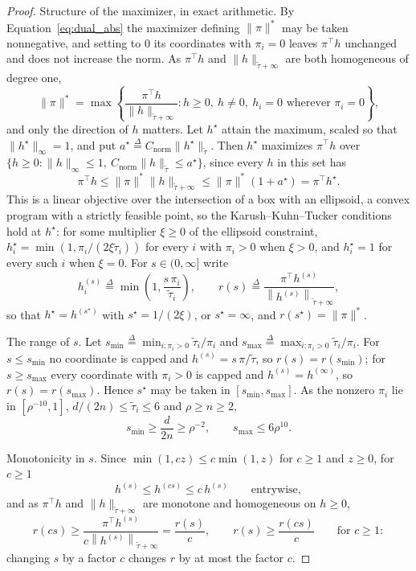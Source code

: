 \documentclass[11pt]{article}
\newcommand{\tautil}{\widetilde{\tau}}
\newcommand{\defeq}{\stackrel{\Delta}{=}}
\newcommand{\Cnorm}{C_{\mathrm{norm}}}
\begin{document}
\begin{proof}
Structure of the maximizer, in exact arithmetic.
By Equation~\eqref{eq:dual_abs} the maximizer defining $\|\pi\|^{*}$ may be
taken nonnegative, and setting to $0$ its coordinates with
$\pi_i = 0$ leaves
$\pi^\top h$ unchanged and does not increase the norm.
As $\pi^\top h$ and
$\|h\|_{\tautil + \infty}$ are both homogeneous of degree one,
\begin{equation}
\label{eq:dual_ratio}
\|\pi\|^{*}
=
\max\left\{
\frac{\pi^\top h}{\|h\|_{\tautil + \infty}}
:
h \ge 0, \ h \ne 0, \ h_i = 0 \text{ wherever } \pi_i = 0
\right\} ,
\end{equation}
and only the direction of $h$ matters.
Let $h^{\star}$ attain the maximum, scaled so that
$\|h^{\star}\|_{\infty} = 1$, and put
$a^{\star} \defeq \Cnorm \|h^{\star}\|_{\tautil}$.
Then $h^{\star}$ maximizes
$\pi^\top h$ over
$\{ h \ge 0 : \|h\|_{\infty} \le 1, \ \Cnorm \|h\|_{\tautil} \le a^{\star} \}$,
since every $h$ in this set has
\[
\pi^\top h
\le
\|\pi\|^{*} \|h\|_{\tautil + \infty}
\le
\|\pi\|^{*} \left( 1 + a^{\star} \right)
=
\pi^\top h^{\star} .
\]
This is a linear objective over the intersection of a box with an ellipsoid, a
convex program with a strictly feasible point, so the Karush--Kuhn--Tucker
conditions hold at $h^{\star}$: for some multiplier
$\xi \ge 0$ of the ellipsoid constraint,
$h^{\star}_i = \min(1, \pi_i / (2 \xi \tautil_i))$ for every
$i$ with
$\pi_i > 0$ when
$\xi > 0$, and
$h^{\star}_i = 1$ for every such
$i$ when
$\xi = 0$.
For $s \in (0, \infty]$ write
\[
h^{(s)}_i
\defeq
\min\left( 1, \frac{s \, \pi_i}{\tautil_i} \right),
\qquad
r(s)
\defeq
\frac{\pi^\top h^{(s)}}{\left\| h^{(s)} \right\|_{\tautil + \infty}} ,
\]
so that $h^{\star} = h^{(s^{\star})}$ with
$s^{\star} = 1 / (2 \xi)$, or
$s^{\star} = \infty$, and
$r(s^{\star}) = \|\pi\|^{*}$.

The range of $s$.
Let $s_{\min} \defeq \min_{i : \pi_i > 0} \tautil_i / \pi_i$ and
$s_{\max} \defeq \max_{i : \pi_i > 0} \tautil_i / \pi_i$.
For $s \le s_{\min}$ no coordinate is capped and
$h^{(s)} = s \, \pi / \tautil$, so
$r(s) = r(s_{\min})$; for
$s \ge s_{\max}$ every coordinate with
$\pi_i > 0$ is capped and
$h^{(s)} = h^{(\infty)}$, so
$r(s) = r(s_{\max})$.
Hence $s^{\star}$ may be taken in
$[s_{\min}, s_{\max}]$.
As the nonzero $\pi_i$ lie in
$[\rho^{-10}, 1]$,
$d / (2 n) \le \tautil_i \le 6$ and
$\rho \ge n \ge 2$,
\[
s_{\min}
\ge
\frac{d}{2 n}
\ge
\rho^{-2},
\qquad
s_{\max}
\le
6 \rho^{10} .
\]

Monotonicity in $s$.
Since $\min(1, c z) \le c \min(1, z)$ for
$c \ge 1$ and
$z \ge 0$, for
$c \ge 1$
\begin{equation}
\label{eq:flat_scaling}
h^{(s)}
\le
h^{(c s)}
\le
c \, h^{(s)}
\qquad
\text{entrywise},
\end{equation}
and as $\pi^\top h$ and
$\|h\|_{\tautil + \infty}$ are monotone and homogeneous on
$h \ge 0$,
\begin{equation}
\label{eq:ratio_loss}
r(c s)
\ge
\frac{\pi^\top h^{(s)}}{c \left\| h^{(s)} \right\|_{\tautil + \infty}}
=
\frac{r(s)}{c},
\qquad
r(s)
\ge
\frac{r(c s)}{c}
\qquad
\text{for } c \ge 1 :
\end{equation}
changing $s$ by a factor
$c$ changes
$r$ by at most the factor
$c$.


\end{proof}
\end{document}

